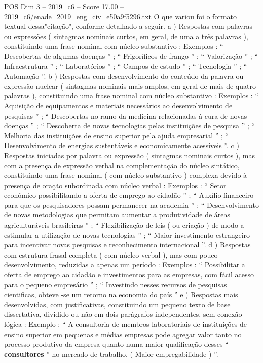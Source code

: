 \begin{textsample}{POS Dim 3 – 2019\_c6 – Score 17.00 – 2019\_c6/enade\_2019\_eng\_civ\_e50a9f5296.txt}
O que variou foi o formato textual dessa"citação", conforme detalhado a seguir. a ) Respostas com palavras ou expressões ( sintagmas nominais curtos, em geral, de uma a três palavras ), constituindo uma frase nominal com núcleo substantivo : Exemplos : “ Descobertas de algumas doenças ” ; “ Frigoríficos de frango ” ; “ Valorização ” ; “ Infraestrutura ” ; “ Laboratórios ” ; “ Campos de estudo ” ; “ Tecnologia ” ; “ Automação ”. b ) Respostas com desenvolvimento do conteúdo da palavra ou expressão nuclear ( sintagmas nominais mais amplos, em geral de mais de quatro palavras ), constituindo uma frase nominal com núcleo substantivo : Exemplos : “ Aquisição de equipamentos e materiais necessários ao desenvolvimento de pesquisas ” ; “ Descobertas no ramo da medicina relacionadas à cura de novas doenças ” ; “ Descoberta de novas tecnologias pelas instituições de pesquisa ” ; “ Melhoria das instituições de ensino superior pela ajuda empresarial ” ; “ Desenvolvimento de energias sustentáveis e economicamente acessíveis ”. c ) Respostas iniciadas por palavra ou expressão ( sintagmas nominais curtos ), mas com a presença de expressão verbal na complementação do núcleo sintático, constituindo uma frase nominal ( com núcleo substantivo ) complexa devido à presença de oração subordinada com núcleo verbal : Exemplos : “ Setor econômico possibilitando a oferta de emprego ao cidadão ” ; “ Auxílio financeiro para que os pesquisadores possam permanecer na academia ” ; “ Desenvolvimento de novas metodologias que permitam aumentar a produtividade de áreas agriculturáveis brasileiras ” ; “ Flexibilização de leis ( ou criação ) de modo a estimular a utilização de novas tecnologias ” ; “ Maior investimento estrangeiro para incentivar novas pesquisas e reconhecimento internacional ”. d ) Respostas com estrutura frasal completa ( com núcleo verbal ), mas com pouco desenvolvimento, reduzidas a apenas um período : Exemplos : “ Possibilitar a oferta de emprego ao cidadão e investimentos para as empresas, com fácil acesso para o pequeno empresário ” ; “ Investindo nesses recursos de pesquisas cientificas, obteve -se um retorno na economia do país ” e ) Respostas mais desenvolvidas, com justificativas, constituindo um pequeno texto de base dissertativa, dividido ou não em dois parágrafos independentes, sem conexão lógica : Exemplo : “ A consultoria de membros laboratoriais de instituições de ensino superior em pequenas e médias empresas pode agregar valor tanto no processo produtivo da empresa quanto numa maior qualificação desses “ \textbf{consultores} ” no mercado de trabalho. ( Maior empregabilidade ) ”.

\end{textsample}
